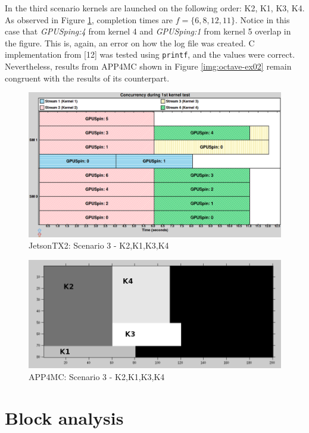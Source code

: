 \documentclass[
  12pt,
  a4paperpaper,
]{report}
\begin{document}
In the third scenario kernels are launched on the following order: K2,
K1, K3, K4. As observed in Figure \ref{img:nvidia-ex05}, completion
times are \(f = \{6,8,12,11\}\). Notice in this case that
\emph{GPUSping:4} from kernel 4 and \emph{GPUSping:1} from kernel 5
overlap in the figure. This is, again, an error on how the log file was
created. C implementation from {[}12{]} was tested using \texttt{printf}, and
the values were correct. Nevertheless, results from APP4MC shown in
Figure \ref{img:octave-ex02} remain congruent with the results of its
counterpart.

\begin{figure}
\centering
\includegraphics[width=1\textwidth,height=\textheight]{source/figures/nvidia/ex05.png}
\caption{JetsonTX2: Scenario 3 - K2,K1,K3,K4 \label{img:nvidia-ex05}}
\end{figure}

\begin{figure}
\centering
\includegraphics[width=1\textwidth,height=\textheight]{source/figures/octave/ex05.png}
\caption{APP4MC: Scenario 3 - K2,K1,K3,K4 \label{img:octave-ex05}}
\end{figure}

\hypertarget{block-analysis}{%
\section{Block analysis}\label{more-results}}
\end{document}
